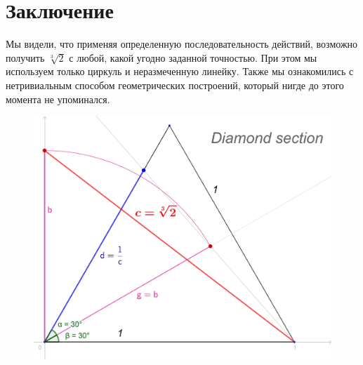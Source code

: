\documentclass[12pt, letterpaper, oneside]{report}
\begin{document}
\begin{center}
\end{center}
\newpage
 
\section{Заключение}

 
Мы видели, что применяя определенную последовательность действий, возможно получить $\sqrt[3]{2}$ с любой, какой угодно заданной точностью. При этом мы используем только циркуль и неразмеченную линейку. Также мы ознакомились с  нетривиальным способом геометрических построений, который нигде до этого момента не упоминался.\\



\begin{figure}[h]
	\centering
	\includegraphics[width=0.6\linewidth]{images/ds_def.jpg}
	
	\label{fig:Diamond Section}
\end{figure}

\newpage
\end{document}

